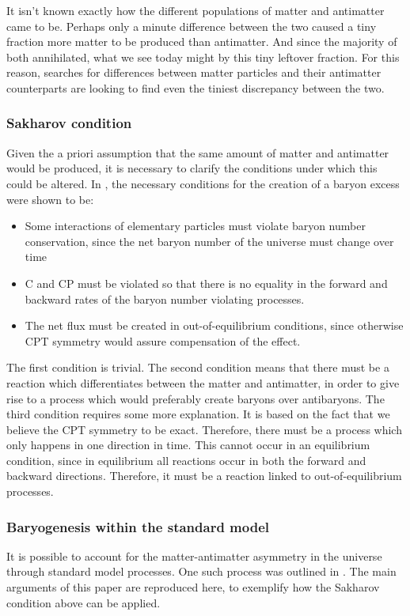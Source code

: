It isn't known exactly how the different populations of matter and antimatter came to be. Perhaps only a minute difference between the two caused a tiny fraction more matter to be produced than antimatter. And since the majority of both annihilated, what we see today might by this tiny leftover fraction. For this reason, searches for differences between matter particles and their antimatter counterparts are looking to find even the tiniest discrepancy between the two\cite{}. 

\subsubsection{Sakharov condition}\label{sec:IntroSakharovContidion}
Given the a priori assumption that the same amount of matter and antimatter would be produced, it is necessary to clarify the conditions under which this could be altered. In \cite{Sakharov:1967dj}, the necessary conditions for the creation of a baryon excess were shown to be:
\begin{itemize}
    \item Some interactions of elementary particles must violate baryon number conservation, since the net baryon number of the universe must change over time
    \item C and CP must be violated so that there is no equality in the forward and backward rates of the baryon number violating processes. 
    \item The net flux must be created in out-of-equilibrium conditions, since otherwise CPT symmetry would assure compensation of the effect. 
\end{itemize}

The first condition is trivial. The second condition means that there must be a reaction which differentiates between the matter and antimatter, in order to give rise to a process which would preferably create baryons over antibaryons. The third condition requires some more explanation. It is based on the fact that we believe the CPT symmetry to be exact. Therefore, there must be a process which only happens in one direction in time. This cannot occur in an equilibrium condition, since in equilibrium all reactions occur in both the forward and backward directions. Therefore, it must be a reaction linked to out-of-equilibrium processes. 


\subsubsection{Baryogenesis within the standard model}\label{sec:IntroBaryogenesisSM}
It is possible to account for the matter-antimatter asymmetry in the universe through standard model processes. One such process was outlined in \cite{Bubbles_asymmetry}. The main arguments of this paper are reproduced here, to exemplify how the Sakharov condition above can be applied. \\

